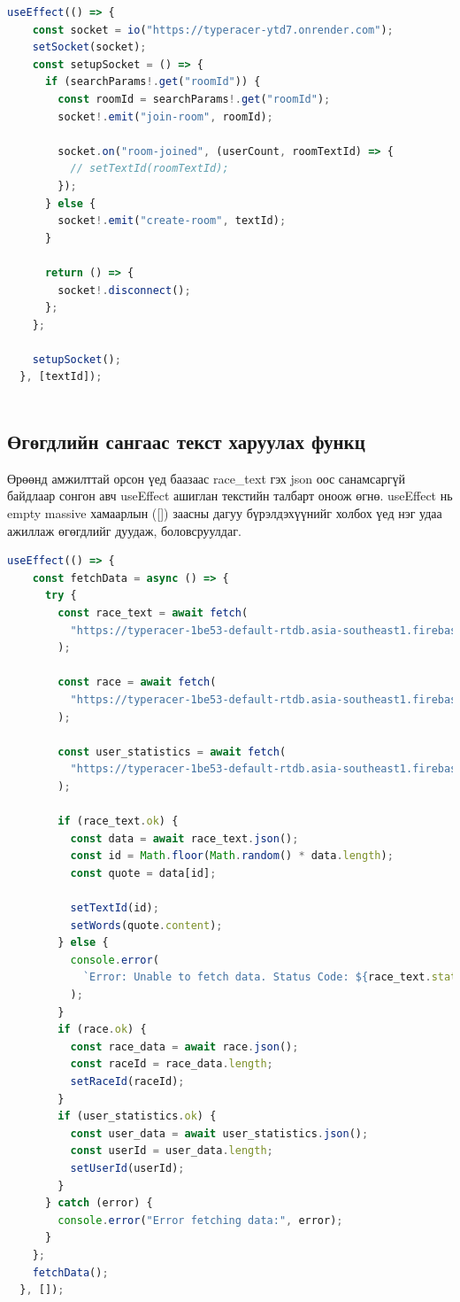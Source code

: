 \begin{lstlisting}[language=Javascript, caption=Хэрэглэгч өрөөнд нэвтрэх client талын код, frame=single]
	useEffect(() => {
    const socket = io("https://typeracer-ytd7.onrender.com");
    setSocket(socket);
    const setupSocket = () => {
      if (searchParams!.get("roomId")) {
        const roomId = searchParams!.get("roomId");
        socket!.emit("join-room", roomId);

        socket.on("room-joined", (userCount, roomTextId) => {
          // setTextId(roomTextId);
        });
      } else {
        socket!.emit("create-room", textId);
      }

      return () => {
        socket!.disconnect();
      };
    };

    setupSocket();
  }, [textId]);
			
\end{lstlisting}


\subsection{Өгөгдлийн сангаас текст харуулах функц}

Өрөөнд амжилттай орсон үед баазаас race\_text гэх json оос санамсаргүй байдлаар сонгон авч useEffect ашиглан текстийн талбарт оноож өгнө.
useEffect нь empty massive хамаарлын ([]) заасны дагуу бүрэлдэхүүнийг холбох үед нэг удаа ажиллаж өгөгдлийг дуудаж, боловсруулдаг.

\begin{lstlisting}[language=Javascript, caption=Текст fetch хийж буй async функц, frame=single]
	useEffect(() => {
    const fetchData = async () => {
      try {
        const race_text = await fetch(
          "https://typeracer-1be53-default-rtdb.asia-southeast1.firebasedatabase.app/race_text.json"
        );

        const race = await fetch(
          "https://typeracer-1be53-default-rtdb.asia-southeast1.firebasedatabase.app/race.json"
        );

        const user_statistics = await fetch(
          "https://typeracer-1be53-default-rtdb.asia-southeast1.firebasedatabase.app/user_statistics.json"
        );

        if (race_text.ok) {
          const data = await race_text.json();
          const id = Math.floor(Math.random() * data.length);
          const quote = data[id];

          setTextId(id);
          setWords(quote.content);
        } else {
          console.error(
            `Error: Unable to fetch data. Status Code: ${race_text.status}`
          );
        }
        if (race.ok) {
          const race_data = await race.json();
          const raceId = race_data.length;
          setRaceId(raceId);
        }
        if (user_statistics.ok) {
          const user_data = await user_statistics.json();
          const userId = user_data.length;
          setUserId(userId);
        }
      } catch (error) {
        console.error("Error fetching data:", error);
      }
    };
    fetchData();
  }, []);
			
\end{lstlisting}

